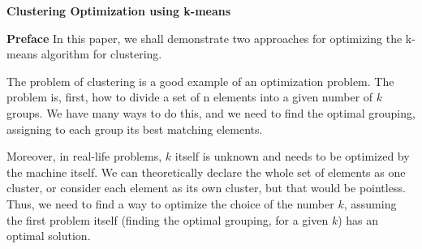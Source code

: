 \documentclass[12pt]{article}
\begin{document}
\textbf{Clustering Optimization using k-means} \newline

\textbf{Preface} \newline
In this paper, we shall demonstrate two approaches for optimizing the \newline
k-means algorithm for clustering. \newline

The problem of clustering is a good example of an optimization problem. \newline 
The problem is, first, how to divide a set of n elements into a given number of \( k \) groups. We have many ways to do this, and we need to find the optimal grouping, assigning to each group its best matching elements. \newline

Moreover, in real-life problems, \( k \) itself is unknown and needs to be optimized by the machine itself. We can theoretically declare the whole set of elements as one cluster, or consider each element as its own cluster, but that would be pointless. Thus, we need to find a way to optimize the choice of the number \( k \), assuming the first problem itself (finding the optimal grouping, for a given \( k \)) has an optimal solution. \newline
\end{document}
